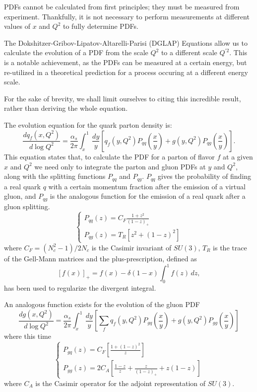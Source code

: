 \documentclass[10pt,a4paper]{book}
\begin{document}
PDFs cannot be calculated from first principles; they must be measured from experiment. Thankfully, it is not necessary to perform measurements at different values of $x$ and $Q^2$ to fully determine PDFs.

The Dokshitzer-Gribov-Lipatov-Altarelli-Parisi (DGLAP) Equations \cite{GRIBOV197178, Altarelli:1977zs} allow us to calculate the evolution of a PDF from the scale $Q^2$ to a different scale $Q^{\prime 2}$. This is a notable achievement, as the PDFs can be measured at a certain energy, but re-utilized in a theoretical prediction for a process occuring at a different energy scale. 

For the sake of brevity, we shall limit ourselves to citing this incredible result, rather than deriving the whole equation.

The evolution equation for the quark parton density is:
\begin{equation}
\frac{dq_f(x,Q^2)}{d\log Q^2} = \frac{\alpha_s}{2\pi}\int_x^1 \, \frac{dy}{y} \left[q_f(y,Q^2)P_{qq}\left(\frac{x}{y} \right) + g(y,Q^2)P_{qg}\left(\frac{x}{y} \right) \right].
\end{equation}
This equation states that, to calculate the PDF for a parton of flavor $f$ at a given $x$ and $Q^2$ we need only to integrate the parton and gluon PDFs at $y$ and $Q^2$, along with the splitting functions $P_{qq}$ and $P_{qg}$. $P_{qq}$ gives the probability of finding a real quark $q$ with a certain momentum fraction after the emission of a virtual gluon, and $P_{qg}$ is the analogous function for the emission of a real quark after a gluon splitting.
\begin{equation}
\begin{cases}
P_{qq}(z) = C_F\frac{1 + z^2}{(1 - z)_+} \\
P_{qg}(z) = T_R\left[z^2 + (1-z)^2 \right]
\end{cases}
\end{equation}
where $C_F = (N_c^2 - 1)/2N_c$ is the Casimir invariant of $SU(3)$, $T_R$ is the trace of the Gell-Mann matrices and the plus-prescription, defined as
\begin{equation}
\left[f(x) \right]_+ = f(x) - \delta (1-x)\int_0^1 f(z) \, dz,
\end{equation}
has been used to regularize the divergent integral. 

An analogous function exists for the evolution of the gluon PDF
\begin{equation}
\frac{dg(x,Q^2)}{d\log Q^2} = \frac{\alpha_s}{2\pi}\int_x^1 \, \frac{dy}{y} \left[\sum_f q_f(y,Q^2)P_{gq}\left(\frac{x}{y} \right) + g(y,Q^2)P_{gg}\left(\frac{x}{y} \right) \right]
\end{equation}
where this time
\begin{equation}
\begin{cases}
P_{gq}(z) = C_F\left[ \frac{1 + (1-z)^2}{z}\right] \\
P_{gg}(z) = 2C_A\left[\frac{1 - z}{z} + \frac{z}{(1 - z)_+} + z(1-z) \right]
\end{cases}
\end{equation}
where $C_A$ is the Casimir operator for the adjoint representation of $SU(3)$.
 
\end{document}
